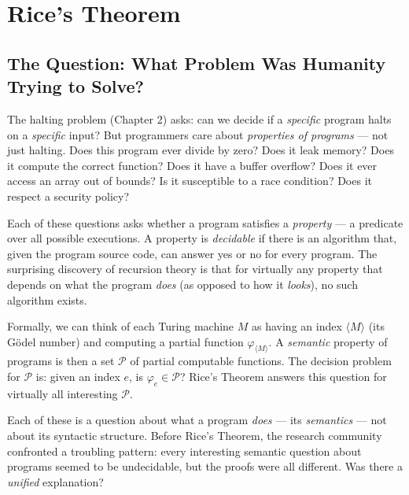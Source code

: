 
\chapter{Rice's Theorem}
\label{ch:rice}

\section{The Question: What Problem Was Humanity Trying to Solve?}
\label{sec:rice:question}

The halting problem (Chapter 2) asks: can we decide if a \emph{specific} program halts on a \emph{specific} input? But programmers care about \emph{properties of programs} --- not just halting. Does this program ever divide by zero? Does it leak memory? Does it compute the correct function? Does it have a buffer overflow? Does it ever access an array out of bounds? Is it susceptible to a race condition? Does it respect a security policy?

Each of these questions asks whether a program satisfies a \emph{property} --- a predicate over all possible executions. A property is \emph{decidable} if there is an algorithm that, given the program source code, can answer yes or no for every program. The surprising discovery of recursion theory is that for virtually any property that depends on what the program \emph{does} (as opposed to how it \emph{looks}), no such algorithm exists.

Formally, we can think of each Turing machine $M$ as having an index $\langle M \rangle$ (its G\"odel number) and computing a partial function $\varphi_{\langle M \rangle}$. A \emph{semantic} property of programs is then a set $\mathcal{P}$ of partial computable functions. The decision problem for $\mathcal{P}$ is: given an index $e$, is $\varphi_e \in \mathcal{P}$? Rice's Theorem answers this question for virtually all interesting $\mathcal{P}$.

Each of these is a question about what a program \emph{does} --- its \emph{semantics} --- not about its syntactic structure. Before Rice's Theorem, the research community confronted a troubling pattern: every interesting semantic question about programs seemed to be undecidable, but the proofs were all different. Was there a \emph{unified} explanation?

